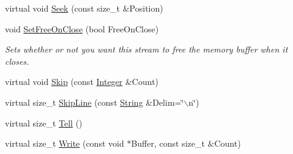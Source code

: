 \begin{DoxyCompactItemize}
\item 
virtual void \hyperlink{classMezzanine_1_1Resource_1_1MemoryDataStream_af93bbd902e5960e046d566f5061064b7}{Seek} (const size\_\-t \&Position)
\item 
void \hyperlink{classMezzanine_1_1Resource_1_1MemoryDataStream_a4e6dbb4c89ff2512dbffa69852a06fda}{SetFreeOnClose} (bool FreeOnClose)
\begin{DoxyCompactList}\small\item\em Sets whether or not you want this stream to free the memory buffer when it closes. \item\end{DoxyCompactList}\item 
virtual void \hyperlink{classMezzanine_1_1Resource_1_1MemoryDataStream_a1864addc676c5832e08704bd8341859f}{Skip} (const \hyperlink{namespaceMezzanine_ac3576e52af3c62d13dde94829e0c5465}{Integer} \&Count)
\item 
virtual size\_\-t \hyperlink{classMezzanine_1_1Resource_1_1MemoryDataStream_af6dedcd3c5301e1631917664efabe3cb}{SkipLine} (const \hyperlink{namespaceMezzanine_acf9fcc130e6ebf08e3d8491aebcf1c86}{String} \&Delim=\char`\"{}$\backslash$n\char`\"{})
\item 
virtual size\_\-t \hyperlink{classMezzanine_1_1Resource_1_1MemoryDataStream_aac15b613b78cd970e01d3592c7f2efc9}{Tell} ()
\item 
virtual size\_\-t \hyperlink{classMezzanine_1_1Resource_1_1MemoryDataStream_a5c1e161caf74c74d7d6f9c2d0d5718b1}{Write} (const void $\ast$Buffer, const size\_\-t \&Count)
\end{DoxyCompactItemize}
